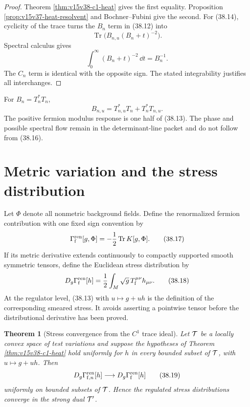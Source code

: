 \documentclass[11pt]{article}
\newtheorem{theorem}{Theorem}[section]
\theoremstyle{remark}
\begin{document}
\begin{proof}
Theorem \ref{thm:v15v38-c1-heat} gives the first equality.
Proposition \ref{prop:v15v37-heat-resolvent} and Bochner--Fubini
give the second.  For (38.14), cyclicity of the trace turns the
\(B_n\) term in (38.12) into
\[
 \operatorname{Tr}\bigl(B_{n,u}(B_n+t)^{-2}\bigr).
\]
Spectral calculus gives
\[
 \int_0^\infty(B_n+t)^{-2}\,\dd t=B_n^{-1}.              \tag{38.15}
\]
The \(C_n\) term is identical with the opposite sign.  The stated
integrability justifies all interchanges.
\end{proof}

For \(B_n=T_n^*T_n\),
\[
 B_{n,u}=T_{n,u}^*T_n+T_n^*T_{n,u}.                     \tag{38.16}
\]
The positive fermion modulus response is one half of (38.13).  The
phase and possible spectral flow remain in the determinant-line
packet and do not follow from (38.16).

\section{Metric variation and the stress distribution}

Let \(\Phi\) denote all nonmetric background fields.  Define the
renormalized fermion contribution with one fixed sign convention by
\[
 \Gamma_{\rm f}^{\rm ren}[g,\Phi]
 =-\frac12\operatorname{Tr}K[g,\Phi].                   \tag{38.17}
\]
If its metric derivative extends continuously to compactly
supported smooth symmetric tensors, define the Euclidean stress
distribution by
\[
 D_g\Gamma_{\rm f}^{\rm ren}[h]
 =\frac12\int_M\sqrt g\,T_{\rm f}^{\mu\nu}h_{\mu\nu}.    \tag{38.18}
\]
At the regulator level, (38.13) with \(u\mapsto g+uh\)
is the definition of the corresponding smeared stress.  It avoids
asserting a pointwise tensor before the distributional derivative
has been proved.

\begin{theorem}[Stress convergence from the \(C^1\) trace ideal]
\label{thm:v15v38-stress-convergence}
Let \({\cal T}\) be a locally convex space of test variations and
suppose the hypotheses of Theorem \ref{thm:v15v38-c1-heat} hold
uniformly for \(h\) in every bounded subset of \({\cal T}\), with
\(u\mapsto g+uh\).  Then
\[
 D_g\Gamma_{{\rm f},n}^{\rm ren}[h]
 \longrightarrow
 D_g\Gamma_{\rm f}^{\rm ren}[h]                          \tag{38.19}
\]
uniformly on bounded subsets of \({\cal T}\).  Hence the regulated
stress distributions converge in the strong dual
\({\cal T}'\).
\end{theorem}
\end{document}

